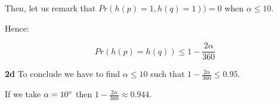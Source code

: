 \documentclass[10pt,a4paper]{article}
\theoremstyle{plain}
\begin{document}
Then, let us remark that $Pr(h(p) = 1, h(q) = 1)) = 0$ when $\alpha \leq 10$.

Hence:

$$
Pr(h(p) = h(q)) \leq 1 - \frac{2\alpha}{360}
$$

\textbf{2d} To conclude we have to find $\alpha \leq 10$ such that $1 - \frac{2\alpha}{360} \leq 0.95$.

If we take $\alpha = 10\degree$ then $1 - \frac{2\alpha}{360} \approx 0.944$.
\end{document}
